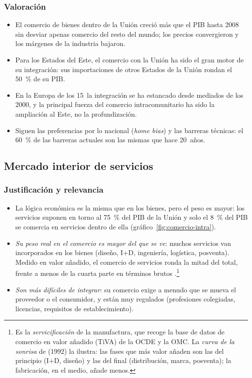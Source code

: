 \documentclass[11pt]{article}
\begin{document}
\subsubsection{Valoración}\label{sec:bienes-valoracion}

\begin{itemize}
\item[(+)] El comercio de bienes dentro de la Unión creció más que el PIB hasta 2008 sin desviar apenas comercio del resto del mundo; los precios convergieron y los márgenes de la industria bajaron.
\item[(+)] Para los Estados del Este, el comercio con la Unión ha sido el gran motor de su integración: sus importaciones de otros Estados de la Unión rondan el 50~\% de su PIB.
\item[(--)] En la Europa de los 15~la integración se ha estancado desde mediados de los 2000, y la principal fuerza del comercio intracomunitario ha sido la ampliación al Este, no la profundización.
\item[(--)] Siguen las preferencias por lo nacional (\emph{home bias}) y las barreras técnicas: el 60~\% de las barreras actuales son las mismas que hace 20~años.
\end{itemize}

\subsection{Mercado interior de servicios}\label{sec:servicios}

\subsubsection{Justificación y relevancia}\label{sec:servicios-relevancia}

\begin{itemize}
\item La lógica económica es la misma que en los bienes, pero el peso es mayor: los servicios suponen en torno al 75~\% del PIB de la Unión\nocite{CE2025EstrategiaFicha} y solo el 8~\% del PIB se comercia en servicios dentro de ella (gráfico~\ref{fig:comercio-intra}).
\item \emph{Su peso real en el comercio es mayor del que se ve}: muchos servicios van incorporados en los bienes (diseño, I+D, ingeniería, logística, posventa). Medido en valor añadido, el comercio de servicios ronda la mitad del total, frente a menos de la cuarta parte en términos brutos .\footnote{Es la \emph{servicificación} de la manufactura, que recoge la base de datos de comercio en valor añadido (TiVA) de la OCDE y la OMC. La \emph{curva de la sonrisa} de  (1992) la ilustra: las fases que más valor añaden son las del principio (I+D, diseño) y las del final (distribución, marca, posventa); la fabricación, en el medio, añade menos.}
\item \emph{Son más difíciles de integrar}: su comercio exige a menudo que se mueva el proveedor o el consumidor, y están muy regulados (profesiones colegiadas, licencias, requisitos de establecimiento).
\end{itemize}
\end{document}
